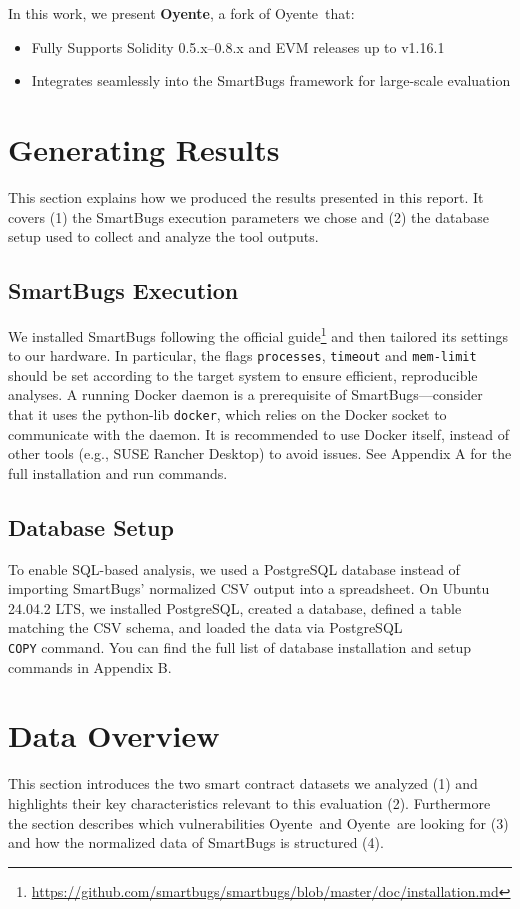 \documentclass{article}
\newcommand\OY{Oyente}
\newcommand\OYp{\OY\raisebox{0.3ex}{\smaller +}}
\begin{document}
	In this work, we present \textbf{\OYp}, a fork of \OY\ that:

	\begin{itemize}
		\item Fully Supports Solidity 0.5.x–0.8.x and EVM releases up to v1.16.1
		\item Integrates seamlessly into the SmartBugs framework for large-scale evaluation
	\end{itemize}

	\section{Generating Results}
	This section explains how we produced the results presented in this report. It covers (1) the SmartBugs execution parameters we chose and (2) the database setup used to collect and analyze the tool outputs.

	\subsection{SmartBugs Execution}
	We installed SmartBugs following the official guide\footnote{\url{https://github.com/smartbugs/smartbugs/blob/master/doc/installation.md}} and then tailored its settings to our hardware. In particular, the flags \texttt{processes}, \texttt{timeout} and \texttt{mem-limit} should be set according to the target system to ensure efficient, reproducible analyses. A running Docker daemon is a prerequisite of SmartBugs---consider that it uses the python-lib \texttt{docker}, which relies on the Docker socket to communicate with the daemon. It is recommended to use Docker itself, instead of other tools (e.g., SUSE Rancher Desktop) to avoid issues. See Appendix A for the full installation and run commands.

	\subsection{Database Setup}
	To enable SQL-based analysis, we used a PostgreSQL database instead of importing SmartBugs’ normalized CSV output into a spreadsheet. On Ubuntu 24.04.2 LTS, we installed PostgreSQL, created a database, defined a table matching the CSV schema, and loaded the data via PostgreSQL \texttt{\\COPY} command. You can find the full list of database installation and setup commands in Appendix B.

	\section{Data Overview}
	This section introduces the two smart contract datasets we analyzed (1) and highlights their key characteristics relevant to this evaluation (2). Furthermore the section describes which vulnerabilities \OY\ and \OYp\ are looking for (3) and how the normalized data of SmartBugs is structured (4).
\end{document}
